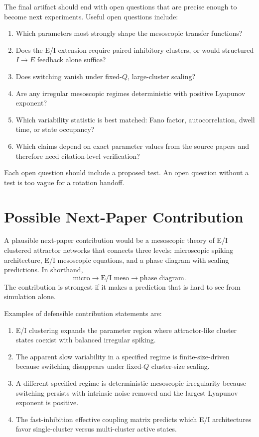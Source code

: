 The final artifact should end with open questions that are precise enough to become next experiments. Useful open questions include:
%
\begin{enumerate}[leftmargin=*]
  \item Which parameters most strongly shape the mesoscopic transfer functions?
  \item Does the E/I extension require paired inhibitory clusters, or would structured $I\to E$ feedback alone suffice?
  \item Does switching vanish under fixed-$Q$, large-cluster scaling?
  \item Are any irregular mesoscopic regimes deterministic with positive Lyapunov exponent?
  \item Which variability statistic is best matched: Fano factor, autocorrelation, dwell time, or state occupancy?
  \item Which claims depend on exact parameter values from the source papers and therefore need citation-level verification?
\end{enumerate}

Each open question should include a proposed test. An open question without a test is too vague for a rotation handoff.

\section{Possible Next-Paper Contribution}
\label{sec:possible-next-paper-contribution}

A plausible next-paper contribution would be a mesoscopic theory of E/I clustered attractor networks that connects three levels: microscopic spiking architecture, E/I mesoscopic equations, and a phase diagram with scaling predictions. In shorthand,
%
\begin{equation}
  \text{micro}
  \longrightarrow
  \text{E/I meso}
  \longrightarrow
  \text{phase diagram}.
  \label{eq:next-paper-three-levels}
\end{equation}
%
The contribution is strongest if it makes a prediction that is hard to see from simulation alone.

Examples of defensible contribution statements are:
%
\begin{enumerate}[leftmargin=*]
  \item E/I clustering expands the parameter region where attractor-like cluster states coexist with balanced irregular spiking.
  \item The apparent slow variability in a specified regime is finite-size-driven because switching disappears under fixed-$Q$ cluster-size scaling.
  \item A different specified regime is deterministic mesoscopic irregularity because switching persists with intrinsic noise removed and the largest Lyapunov exponent is positive.
  \item The fast-inhibition effective coupling matrix predicts which E/I architectures favor single-cluster versus multi-cluster active states.
\end{enumerate}

